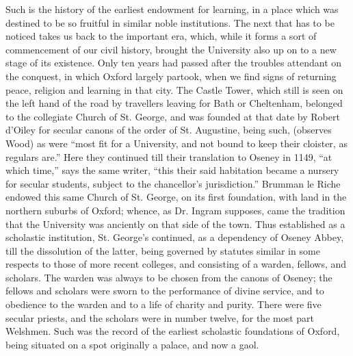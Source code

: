 Such is the history of the
earliest endowment for learning, in a place which was destined to be
so fruitful in similar noble institutions. The next that has to be
noticed takes us back to the important era, which, while it forms a
sort of commencement of our civil history, brought the University also
up on to a new stage of its existence. Only ten years had passed
after the troubles attendant on the conquest, in which Oxford largely
partook, when we find signs of returning peace, religion and learning
in that city. The Castle Tower, which still is seen on the left hand
of the road by travellers leaving for Bath or Cheltenham, belonged to
the collegiate Church of St. George, and was founded at that date by
Robert d'Oiley for secular canons of the order of St. Augustine, being
such, (observes Wood) as were ``most fit for a University, and not
bound to keep their cloister, as regulars are.'' Here they continued
till their translation to Oseney in 1149, ``at which time,'' says the
same writer, ``this their said habitation became a nursery for secular
students, subject to the chancellor's jurisdiction.'' Brumman le Riche
endowed this same Church of St. George, on its first foundation, with
land in the northern suburbs of Oxford; whence, as Dr. Ingram
supposes, came the tradition that the University was anciently on that
side of the town. Thus established as a scholastic institution, St.
George's continued, as a dependency of Oseney Abbey, till the
dissolution of the latter, being governed by statutes similar in some
respects to those of more recent colleges, and consisting of a warden,
fellows, and scholars. The warden was always to be chosen from the
canons of Oseney; the fellows and scholars were sworn to the
performance of divine service, and to obedience to the warden and to a
life of charity and purity. There were five secular priests, and the
scholars were in number twelve, for the most part Welshmen. Such was
the record of the earliest scholastic foundations of Oxford, being
situated on a spot originally a palace, and now a gaol.

